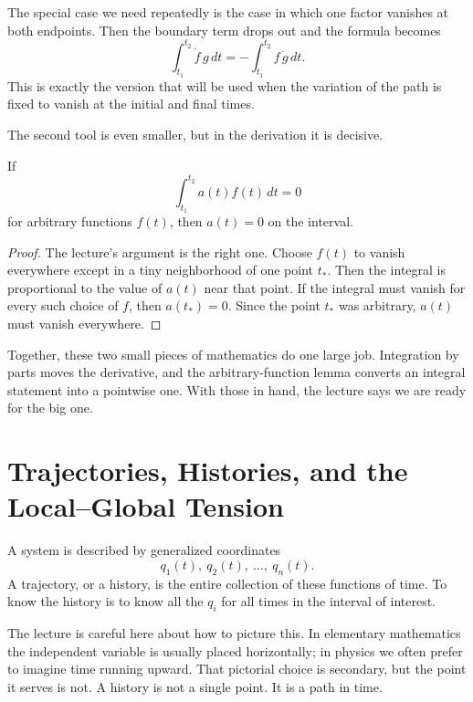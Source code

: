 The special case we need repeatedly is the case in which one factor vanishes at both endpoints. Then the boundary term drops out and the formula becomes
\begin{equation}
\int_{t_1}^{t_2}\dot f\,g\,dt=-\int_{t_1}^{t_2}f\,\dot g\,dt.
\end{equation}
This is exactly the version that will be used when the variation of the path is fixed to vanish at the initial and final times.

The second tool is even smaller, but in the derivation it is decisive.

\begin{proposition}
If
\begin{equation}
\int_{t_1}^{t_2}a(t)f(t)\,dt=0
\end{equation}
for arbitrary functions \(f(t)\), then \(a(t)=0\) on the interval.
\end{proposition}

\begin{proof}
The lecture's argument is the right one. Choose \(f(t)\) to vanish everywhere except in a tiny neighborhood of one point \(t_*\). Then the integral is proportional to the value of \(a(t)\) near that point. If the integral must vanish for every such choice of \(f\), then \(a(t_*)=0\). Since the point \(t_*\) was arbitrary, \(a(t)\) must vanish everywhere.
\end{proof}

Together, these two small pieces of mathematics do one large job. Integration by parts moves the derivative, and the arbitrary-function lemma converts an integral statement into a pointwise one. With those in hand, the lecture says we are ready for the big one.

\section{Trajectories, Histories, and the Local--Global Tension}

A system is described by generalized coordinates
\[
q_1(t),\ q_2(t),\ \dots,\ q_n(t).
\]
A trajectory, or a history, is the entire collection of these functions of time. To know the history is to know all the \(q_i\) for all times in the interval of interest.

The lecture is careful here about how to picture this. In elementary mathematics the independent variable is usually placed horizontally; in physics we often prefer to imagine time running upward. That pictorial choice is secondary, but the point it serves is not. A history is not a single point. It is a path in time.

